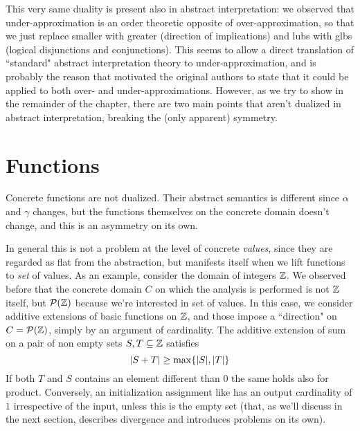 This very same duality is present also in abstract interpretation: we observed that under-approximation is an order theoretic opposite of over-approximation, so that we just replace smaller with greater (direction of implications) and lubs with glbs (logical disjunctions and conjunctions).
This seems to  allow a direct translation of ``standard" abstract interpretation theory to under-approximation, and is probably the reason that motivated the original authors to state that it could be applied to both over- and under-approximations. However, as we try to show in the remainder of the chapter, there are two main points that aren't dualized in abstract interpretation, breaking the (only apparent) symmetry.

\section{Functions}
Concrete functions are not dualized. Their abstract semantics is different since $\alpha$ and $\gamma$ changes, but the functions themselves on the concrete domain doesn't change, and this is an asymmetry on its own.

In general this is not a problem at the level of concrete \textit{values}, since they are regarded as flat from the abstraction, but manifests itself when we lift functions to \textit{set} of values.
As an example, consider the domain of integers $\mathbb{Z}$. We observed before that the concrete domain $C$ on which the analysis is performed is not $\mathbb{Z}$ itself, but $\mathcal{P}(\mathbb{Z})$ because we're interested in set of values. In this case, we consider additive extensions of basic functions on $\mathbb{Z}$, and those impose a ``direction" on $C = \mathcal{P}(\mathbb{Z})$, simply by an argument of cardinality.
The additive extension of sum on a pair of non empty sets $S, T \subseteq \mathbb{Z}$ satisfies
\[
\lvert S + T\rvert \ge \max\{ \lvert S\rvert, \lvert T\rvert \}
\]
If both $T$ and $S$ contains an element different than $0$ the same holds also for product.
Conversely, an initialization assignment like  has an output cardinality of $1$ irrespective of the input, unless this is the empty set (that, as we'll discuss in the next section, describes divergence and introduces problems on its own).

